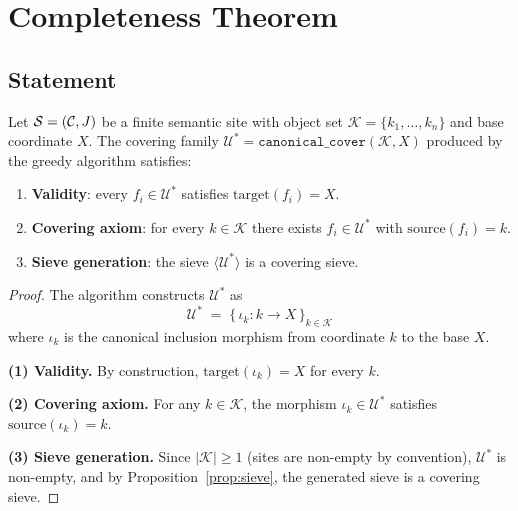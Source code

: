 \documentclass[11pt]{article}
\begin{document}
\section{Completeness Theorem}\label{sec:theorem}

\subsection{Statement}

\begin{theorem}
\label{thm:completeness}
Let $\mathcal{S} = (\mathcal{C}, J)$ be a finite semantic site with object
set $\mathcal{K} = \{k_1,\dots,k_n\}$ and base coordinate $X$.
The covering family $\mathcal{U}^* = \texttt{canonical\_cover}
(\mathcal{K}, X)$ produced by the greedy algorithm satisfies:
\begin{enumerate}
  \item \textbf{Validity}: every $f_i \in \mathcal{U}^*$ satisfies
        $\mathrm{target}(f_i) = X$.
  \item \textbf{Covering axiom}: for every $k \in \mathcal{K}$
        there exists $f_i \in \mathcal{U}^*$ with
        $\mathrm{source}(f_i) = k$.
  \item \textbf{Sieve generation}: the sieve
        $\langle \mathcal{U}^* \rangle$ is a covering sieve.
\end{enumerate}
\end{theorem}

\begin{proof}
The algorithm constructs $\mathcal{U}^*$ as
\[
  \mathcal{U}^* \;=\; \bigl\{\, \iota_k : k \longrightarrow X \,\bigr\}_{k \in \mathcal{K}}
\]
where $\iota_k$ is the canonical inclusion morphism from coordinate $k$
to the base $X$.

\textbf{(1) Validity.}
By construction, $\mathrm{target}(\iota_k) = X$ for every $k$.

\textbf{(2) Covering axiom.}
For any $k \in \mathcal{K}$, the morphism $\iota_k \in \mathcal{U}^*$
satisfies $\mathrm{source}(\iota_k) = k$.

\textbf{(3) Sieve generation.}
Since $|\mathcal{K}| \geq 1$ (sites are non-empty by convention),
$\mathcal{U}^*$ is non-empty, and by Proposition~\ref{prop:sieve},
the generated sieve is a covering sieve.
\end{proof}
\end{document}
